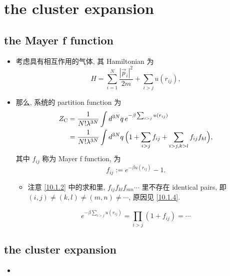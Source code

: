 \chapter{the cluster expansion}
\section{the Mayer f function}
\begin{itemize}
	\item 考虑具有相互作用的气体, 其 Hamiltonian 为
	\begin{equation}
		H = \sum_{i = 1}^N \frac{|\vec{p}_i|^2}{2 m} + \sum_{i > j} u(r_{i j}),
	\end{equation}
	
	\item 那么, 系统的 partition function 为
	\begin{align}
		Z_\text{C} &= \frac{1}{N! \lambda^{3 N}} \int d^{3 N} q \, e^{- \beta \sum_{i > j} u(r_{i j})} \notag \\
		&= \frac{1}{N! \lambda^{3 N}} \int d^{3 N} q \, \Big( 1 + \sum_{i > j} f_{i j} + \sum_{i > j, k > l} f_{i j} f_{k l} \Big), \label{10.1.2}
	\end{align}
	其中 $f_{i j}$ 称为 Mayer f function, 为
	\begin{equation}
		f_{i j} := e^{- \beta u(r_{i j})} - 1.
	\end{equation}
	\begin{itemize}
		\item 注意 \eqref{10.1.2} 中的求和里, $f_{i j} f_{k l} f_{m n} \cdots$ 里不存在 identical pairs, 即 $(i, j) \neq (k, l) \neq (m, n) \neq \cdots$, 原因见 \eqref{10.1.4}.
	\end{itemize}
	
	\begin{tcolorbox}[title=proof:]
		\begin{equation} \label{10.1.4}
			e^{- \beta \sum_{i > j} u(r_{i j})} = \prod_{i > j} (1 + f_{i j}) = \cdots
		\end{equation}
	\end{tcolorbox}
\end{itemize}

\section{the cluster expansion}
\begin{itemize}
	\item 
\end{itemize}
